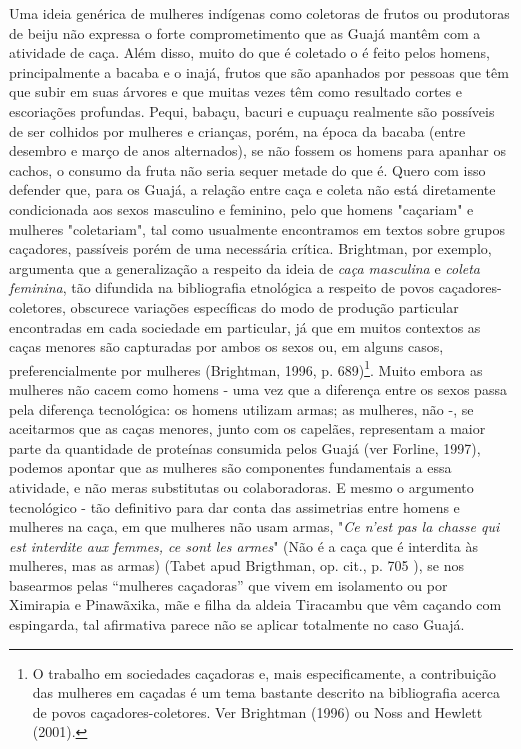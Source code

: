 Uma ideia genérica de mulheres indígenas como coletoras de frutos ou
produtoras de beiju não expressa o forte comprometimento que as Guajá
mantêm com a atividade de caça. Além disso, muito do que é coletado o é
feito pelos homens, principalmente a bacaba e o inajá, frutos que são
apanhados por pessoas que têm que subir em suas árvores e que muitas
vezes têm como resultado cortes e escoriações profundas. Pequi, babaçu,
bacuri e cupuaçu realmente são possíveis de ser colhidos por mulheres e
crianças, porém, na época da bacaba (entre desembro e março de anos
alternados), se não fossem os homens para apanhar os cachos, o consumo
da fruta não seria sequer metade do que é. Quero com isso defender que,
para os Guajá, a relação entre caça e coleta não está diretamente
condicionada aos sexos masculino e feminino, pelo que homens "caçariam"
e mulheres "coletariam", tal como usualmente encontramos em textos sobre
grupos caçadores, passíveis porém de uma necessária crítica. Brightman,
por exemplo, argumenta que a generalização a respeito da ideia de
\emph{caça masculina} e \emph{coleta feminina}, tão difundida na
bibliografia etnológica a respeito de povos caçadores-coletores,
obscurece variações específicas do modo de produção particular
encontradas em cada sociedade em particular, já que em muitos contextos
as caças menores são capturadas por ambos os sexos ou, em alguns casos,
preferencialmente por mulheres (Brightman, 1996, p. 689)\footnote{O
  trabalho em sociedades caçadoras e, mais especificamente, a
  contribuição das mulheres em caçadas é um tema bastante descrito na
  bibliografia acerca de povos caçadores-coletores. Ver Brightman (1996)
  ou Noss and Hewlett (2001).}. Muito embora as mulheres não cacem como
homens - uma vez que a diferença entre os sexos passa pela diferença
tecnológica: os homens utilizam armas; as mulheres, não -, se aceitarmos
que as caças menores, junto com os capelães, representam a maior parte
da quantidade de proteínas consumida pelos Guajá (ver Forline, 1997),
podemos apontar que as mulheres são componentes fundamentais a essa
atividade, e não meras substitutas ou colaboradoras. E mesmo o argumento
tecnológico - tão definitivo para dar conta das assimetrias entre homens
e mulheres na caça, em que mulheres não usam armas, "\emph{Ce n'est pas
la chasse qui est interdite aux femmes, ce sont les armes}" (Não é a
caça que é interdita às mulheres, mas as armas) (Tabet apud Brigthman,
op. cit., p. 705 ), se nos basearmos pelas ``mulheres caçadoras'' que
vivem em isolamento ou por Ximirapia e Pinawãxika, mãe e filha da aldeia
Tiracambu que vêm caçando com espingarda, tal afirmativa parece não se
aplicar totalmente no caso Guajá.

